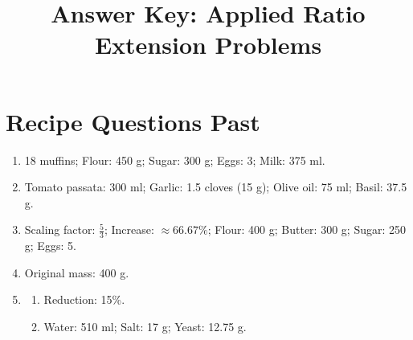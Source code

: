 \documentclass[12pt]{article}
\title{Answer Key: Applied Ratio Extension Problems}
\date{}
\begin{document}
\maketitle

\section*{Recipe Questions Past}
\begin{enumerate}
    \item 18 muffins; Flour: 450 g; Sugar: 300 g; Eggs: 3; Milk: 375 ml.
    \item Tomato passata: 300 ml; Garlic: 1.5 cloves (15 g); Olive oil: 75 ml; Basil: 37.5 g.
    \item Scaling factor: $\frac{5}{3}$; Increase: $\approx 66.67\%$; Flour: 400 g; Butter: 300 g; Sugar: 250 g; Eggs: 5.
    \item Original mass: 400 g.
    \item 
    \begin{enumerate}
        \item Reduction: 15\%.
        \item Water: 510 ml; Salt: 17 g; Yeast: 12.75 g.
    \end{enumerate}
\end{enumerate}
\end{document}
